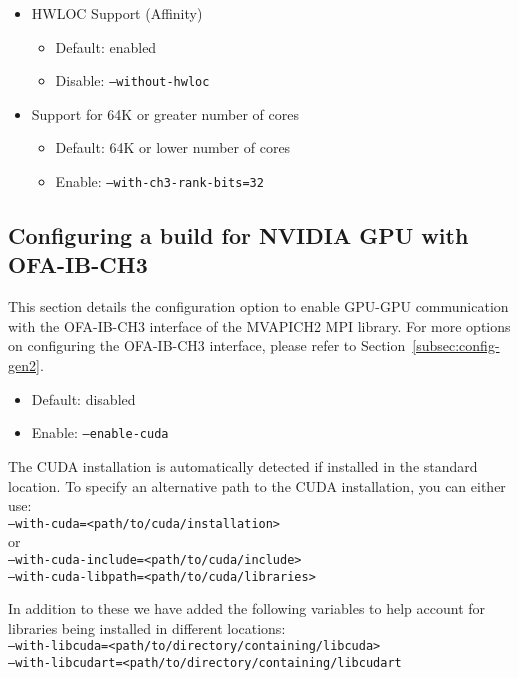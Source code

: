 \begin{itemize}
	\item HWLOC Support (Affinity)
		\begin{itemize}
			\item Default: enabled
			\item Disable: \texttt{--without-hwloc}
		\end{itemize}
	\item Support for 64K or greater number of cores
		\begin{itemize}
			\item Default: 64K or lower number of cores
			\item Enable: \texttt{--with-ch3-rank-bits=32}
		\end{itemize}

\end{itemize}


\subsection{Configuring a build for NVIDIA GPU with OFA-IB-CH3}
\label{subsec:config-cuda-gen2}

This section details the configuration option to enable GPU-GPU
communication with the OFA-IB-CH3 interface of the MVAPICH2 MPI library.
For more options on configuring the OFA-IB-CH3 interface, please refer to
Section~\ref{subsec:config-gen2}.

\begin{itemize}
    \item Default: disabled
    \item Enable: \texttt{--enable-cuda}
\end{itemize}

The CUDA installation is automatically detected if installed in the standard
location. To specify an alternative path to the CUDA installation, you can
either use:\\
\texttt{--with-cuda=<path/to/cuda/installation> } \\
or \\
\texttt{--with-cuda-include=<path/to/cuda/include> \\
    --with-cuda-libpath=<path/to/cuda/libraries>}

In addition to these we have added the following variables to help account for libraries being installed in different locations:\\
\texttt{--with-libcuda=<path/to/directory/containing/libcuda>}\\
\texttt{--with-libcudart=<path/to/directory/containing/libcudart}

